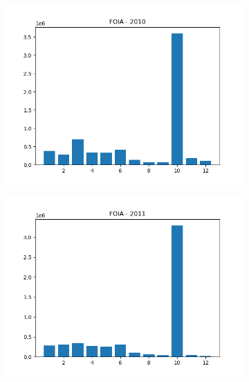 \documentclass{article}
\begin{document}
\begin{figure}[H]
\begin{subfigure}{.5\textwidth}
        \includegraphics[width=\textwidth]{../../output/figures/annual_source_distribution/FOIA_data_dist_2010.png}
    \end{subfigure}
    \begin{subfigure}{.5\textwidth}
        \centering
        \includegraphics[width=\textwidth]{../../output/figures/annual_source_distribution/FOIA_data_dist_2011.png}
    \end{subfigure}
\end{figure}

\newpage 
\end{document}
